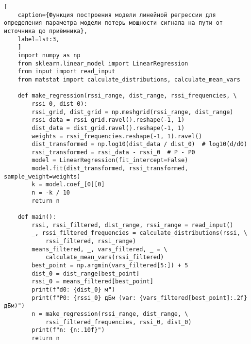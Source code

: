 \begin{lstlisting}[
	caption={Функция построения модели линейной регрессии для определения параметра модели потерь мощности сигнала на пути от источника до приёмника},
	label=lst:3,
	]
	import numpy as np
	from sklearn.linear_model import LinearRegression
	from input import read_input
	from matstat import calculate_distributions, calculate_mean_vars
	
	def make_regression(rssi_range, dist_range, rssi_frequencies, \
		rssi_0, dist_0):
		rssi_grid, dist_grid = np.meshgrid(rssi_range, dist_range)
		rssi_data = rssi_grid.ravel().reshape(-1, 1)
		dist_data = dist_grid.ravel().reshape(-1, 1)
		weights = rssi_frequencies.reshape(-1, 1).ravel()
		dist_transformed = np.log10(dist_data / dist_0)  # log10(d/d0)
		rssi_transformed = rssi_data - rssi_0  # P - P0
		model = LinearRegression(fit_intercept=False)
		model.fit(dist_transformed, rssi_transformed, sample_weight=weights)
		k = model.coef_[0][0]
		n = -k / 10
		return n
	
	def main():
		rssi, rssi_filtered, dist_range, rssi_range = read_input()
		_, rssi_filtered_frequencies = calculate_distributions(rssi, \
			rssi_filtered, rssi_range)
		means_filtered, _, vars_filtered, _ = \
			calculate_mean_vars(rssi_filtered)
		best_point = np.argmin(vars_filtered[5:]) + 5
		dist_0 = dist_range[best_point]
		rssi_0 = means_filtered[best_point]
		print(f"d0: {dist_0} м")
		print(f"P0: {rssi_0} дБм (var: {vars_filtered[best_point]:.2f} дБм)")
		n = make_regression(rssi_range, dist_range, \
			rssi_filtered_frequencies, rssi_0, dist_0)
		print(f"n: {n:.10f}")
		return n
\end{lstlisting}

